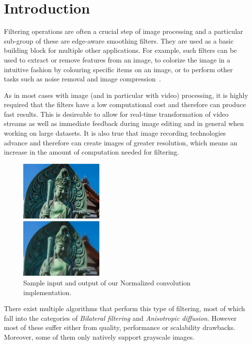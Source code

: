 \section{Introduction}\label{sec:intro}
Filtering operations are often a crucial step of image processing and a particular sub-group of these are edge-aware smoothing filters. 
They are used as a basic building block for multiple other applications.
For example, such filters can be used to extract or remove features from an
image, to colorize the image in a intuitive fashion by colouring specific
items on an image, or to perform other tasks such as noise removal and
image compression~\cite{GastalOliveira2011DomainTransform}.

As in most cases with image (and in particular with video) processing, it is highly required that the filters have a low computational cost and therefore can produce fast results. This is desireable to allow for real-time transformation of video streams as well as immediate feedback during image editing and in general when working on large datasets. 
It is also true that image recording technologies advance and therefore can create images of greater resolution, which means an increase in
the amount of computation needed for filtering.

\setlength\fboxsep{0pt}
\setlength\fboxrule{0.5pt}
 
\begin{figure}\vspace{-1mm}
  \includegraphics[trim=-30mm 0mm 0mm 0mm, clip, width=0.37\textwidth]{figures/input_output}
  \caption{Sample input and output of our Normalized convolution implementation.\label{performance}}
\end{figure}


There exist multiple algorithms that perform this type of filtering, most of which fall into the categories of \textit{Bilateral filtering} and \textit{Anisotropic diffusion}. However most of these suffer either from quality, performance or scalability drawbacks. Moreover, some of them only natively support grayscale images.

